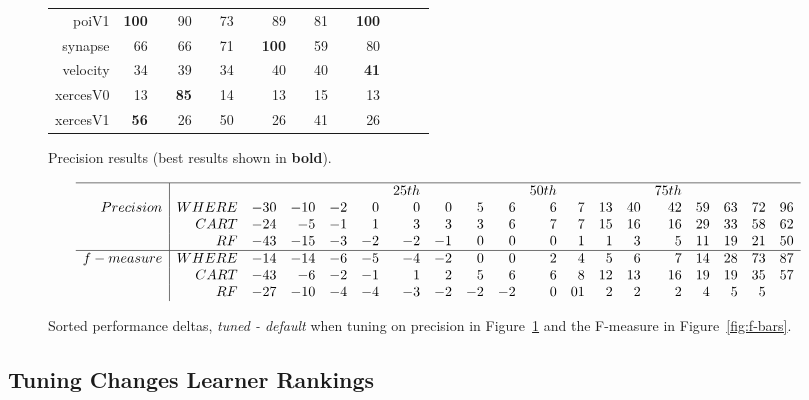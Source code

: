 \documentclass{sig-alternative}
\newcommand{\rone}{}
\newcommand{\rtwo}{}
\newcommand{\rthree}{}
\newcommand{\rfour}{}
\newcommand{\fig}[1]{Figure~\ref{fig:#1}}
\begin{document}
\begin{figure}[!h]
\begin{tabular}{r|rl|rl|rl|rl|rl|rlrl}
poiV1 & {\bf  100} & {\rfour} & 90 & {\rthree} & 73 &         & 89 & {\rtwo} & 81 & {\rone} & {\bf 100} & {\rfour}\\
synapse & 66 &         & 66 &         & 71 & {\rone} & {\bf 100} & {\rfour} & 59 &         & 80 & {\rtwo}\\
velocity & 34 &         & 39 & {\rthree} & 34 &         & 40 & {\rfour} & 40 & {\rfour} & {\bf 41} & {\rfour}\\
xercesV0 & 13 &         & {\bf 85} & {\rfour} & 14 &         & 13 &         & 15 &         & 13 &        \\
xercesV1 & {\bf 56} & {\rfour} & 26 &         & 50 & {\rthree} & 26 &         & 41 & {\rtwo} & 26 &        \\
\end{tabular}
\caption{Precision results (best results  shown in {\bf bold}).}
\label{fig:precisionbars}
\end{figure}


\begin{figure}
\begin{center}
{\small\[\begin{array}{r|rrrrrrrrrrrrrrrrrr}\hline
          &      &      &       &   &       & 25th  &   & &  & 50th     &   &  &      & 75th  &   &   &     &\\
Precision & WHERE&	-30	&-10	&-2 &	0	&0	&0	&5&	6&	6	&7	&13&	40&	42&	59&	63&	72	&96\\
																		
&CART&	-24&	-5	&-1	&1	&3	&3	&3	&6	&7	&7	&15&	16	&16&	29	&33&	58&	62\\
															
&RF &	-43&	-15&	-3	&-2	&-2&	-1	&0	&0	&0	&1	&1	&3	&5&	11&	19&	21	&50\\\hline 
f-measure &	WHERE&	-14&	-14	&-6&	-5	&-4	&-2&	0	&0	&2	&4	&5	&6	&7&	14&	28	&73	&87\\
	&CART	&-43	&-6	&-2&	-1&	1	&2	&5&	6&	6	&8	&12&	13&	16&	19&	19	&35&	57\\
	&RF	&-27	&-10	&-4	&-4&	-3	&-2	&-2	&-2&	0	&0	1&	2	&2	&2	&4	&5	&5
	\end{array} \]}
	\end{center}
\caption{Sorted performance deltas, {\em tuned - default} when tuning on precision in \fig{precisionbars}
and the F-measure in \fig{f-bars}.}
\end{figure}
\subsection{Tuning Changes Learner Rankings}\label{sect:rank}
\end{document}
